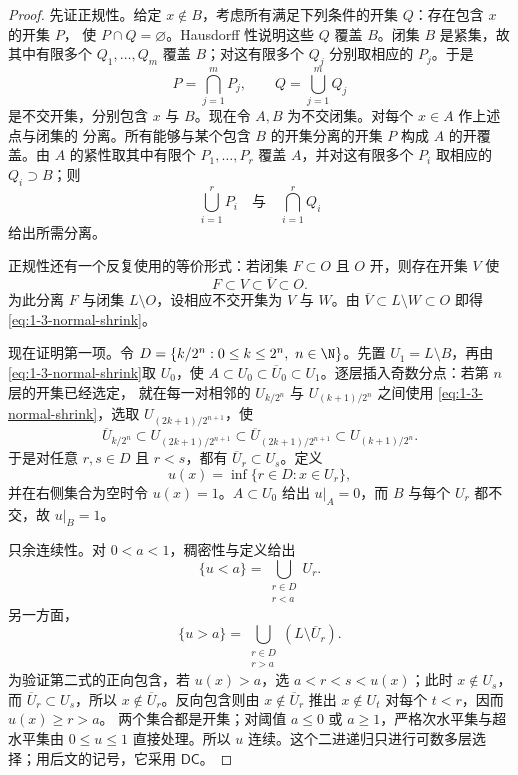 \begin{proof}
先证正规性。给定 $x\notin B$，考虑所有满足下列条件的开集 $Q$：存在包含 $x$ 的开集 $P$，
使 $P\cap Q=\varnothing$。Hausdorff 性说明这些 $Q$ 覆盖 $B$。闭集 $B$ 是紧集，故其中有限多个
$Q_1,\ldots,Q_m$ 覆盖 $B$；对这有限多个 $Q_j$ 分别取相应的 $P_j$。于是
\[
  P=\bigcap_{j=1}^mP_j,\qquad Q=\bigcup_{j=1}^mQ_j
\]
是不交开集，分别包含 $x$ 与 $B$。现在令 $A,B$ 为不交闭集。对每个 $x\in A$ 作上述点与闭集的
分离。所有能够与某个包含 $B$ 的开集分离的开集 $P$ 构成 $A$ 的开覆盖。由 $A$ 的紧性取其中有限个
$P_1,\ldots,P_r$ 覆盖 $A$，并对这有限多个 $P_i$ 取相应的 $Q_i\supset B$；则
\[
  \bigcup_{i=1}^rP_i
  \quad\text{与}\quad
  \bigcap_{i=1}^rQ_i
\]
给出所需分离。

正规性还有一个反复使用的等价形式：若闭集 $F\subset O$ 且 $O$ 开，则存在开集 $V$ 使
\begin{equation}\label{eq:1-3-normal-shrink}
  F\subset V\subset\overline V\subset O.
\end{equation}
为此分离 $F$ 与闭集 $L\setminus O$，设相应不交开集为 $V$ 与 $W$。由
$\overline V\subset L\setminus W\subset O$ 即得\eqref{eq:1-3-normal-shrink}。

现在证明第一项。令 $D=\{k/2^n:0\le k\le2^n,\ n\in\N\}$。先置
$U_1=L\setminus B$，再由\eqref{eq:1-3-normal-shrink}取 $U_0$，使
$A\subset U_0\subset\overline U_0\subset U_1$。逐层插入奇数分点：若第 $n$ 层的开集已经选定，
就在每一对相邻的 $U_{k/2^n}$ 与 $U_{(k+1)/2^n}$ 之间使用
\eqref{eq:1-3-normal-shrink}，选取 $U_{(2k+1)/2^{n+1}}$，使
\[
 \overline U_{k/2^n}
 \subset U_{(2k+1)/2^{n+1}}
 \subset\overline U_{(2k+1)/2^{n+1}}
 \subset U_{(k+1)/2^n}.
\]
于是对任意 $r,s\in D$ 且 $r<s$，都有 $\overline U_r\subset U_s$。定义
\[
  u(x)=\inf\{r\in D:x\in U_r\},
\]
并在右侧集合为空时令 $u(x)=1$。$A\subset U_0$ 给出 $u|_A=0$，而 $B$ 与每个 $U_r$
都不交，故 $u|_B=1$。

只余连续性。对 $0<a<1$，稠密性与定义给出
\[
  \{u<a\}=\bigcup_{\substack{r\in D\\r<a}}U_r.
\]
另一方面，
\[
  \{u>a\}=\bigcup_{\substack{r\in D\\r>a}}(L\setminus\overline U_r).
\]
为验证第二式的正向包含，若 $u(x)>a$，选 $a<r<s<u(x)$；此时 $x\notin U_s$，而
$\overline U_r\subset U_s$，所以 $x\notin\overline U_r$。反向包含则由
$x\notin\overline U_r$ 推出 $x\notin U_t$ 对每个 $t<r$，因而 $u(x)\ge r>a$。
两个集合都是开集；对阈值 $a\le0$ 或 $a\ge1$，严格次水平集与超水平集由 $0\le u\le1$
直接处理。所以 $u$ 连续。这个二进递归只进行可数多层选择；用后文的记号，它采用
$\textsf{DC}$。


\end{proof}
